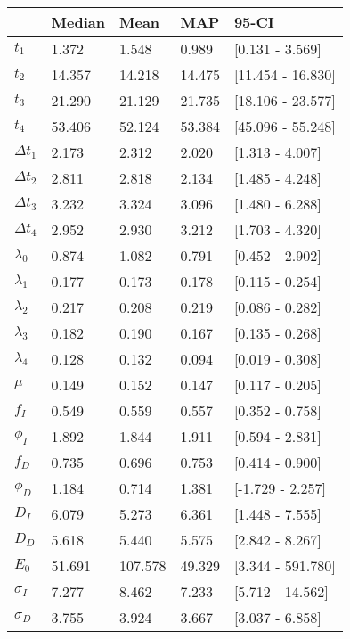 \begin{tabular}{lllll}
\toprule
{} &  Median &     Mean &     MAP &              95-CI \\
\midrule
$t_1$        &   1.372 &    1.548 &   0.989 &    [0.131 - 3.569] \\
$t_2$        &  14.357 &   14.218 &  14.475 &  [11.454 - 16.830] \\
$t_3$        &  21.290 &   21.129 &  21.735 &  [18.106 - 23.577] \\
$t_4$        &  53.406 &   52.124 &  53.384 &  [45.096 - 55.248] \\
$\Delta t_1$ &   2.173 &    2.312 &   2.020 &    [1.313 - 4.007] \\
$\Delta t_2$ &   2.811 &    2.818 &   2.134 &    [1.485 - 4.248] \\
$\Delta t_3$ &   3.232 &    3.324 &   3.096 &    [1.480 - 6.288] \\
$\Delta t_4$ &   2.952 &    2.930 &   3.212 &    [1.703 - 4.320] \\
$\lambda_0$  &   0.874 &    1.082 &   0.791 &    [0.452 - 2.902] \\
$\lambda_1$  &   0.177 &    0.173 &   0.178 &    [0.115 - 0.254] \\
$\lambda_2$  &   0.217 &    0.208 &   0.219 &    [0.086 - 0.282] \\
$\lambda_3$  &   0.182 &    0.190 &   0.167 &    [0.135 - 0.268] \\
$\lambda_4$  &   0.128 &    0.132 &   0.094 &    [0.019 - 0.308] \\
$\mu$        &   0.149 &    0.152 &   0.147 &    [0.117 - 0.205] \\
$f_I$        &   0.549 &    0.559 &   0.557 &    [0.352 - 0.758] \\
$\phi_I$     &   1.892 &    1.844 &   1.911 &    [0.594 - 2.831] \\
$f_D$        &   0.735 &    0.696 &   0.753 &    [0.414 - 0.900] \\
$\phi_D$     &   1.184 &    0.714 &   1.381 &   [-1.729 - 2.257] \\
$D_I$        &   6.079 &    5.273 &   6.361 &    [1.448 - 7.555] \\
$D_D$        &   5.618 &    5.440 &   5.575 &    [2.842 - 8.267] \\
$E_0$        &  51.691 &  107.578 &  49.329 &  [3.344 - 591.780] \\
$\sigma_I$   &   7.277 &    8.462 &   7.233 &   [5.712 - 14.562] \\
$\sigma_D$   &   3.755 &    3.924 &   3.667 &    [3.037 - 6.858] \\

\end{tabular}
